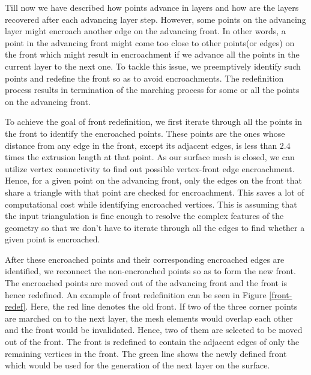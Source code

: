 \documentclass[conf]{new-aiaa}
\begin{document}
Till now we have described how points advance in layers and how are the layers recovered after each advancing layer step. However, some points on the advancing layer might encroach another edge on the advancing front. In other words, a point in the advancing front might come too close to other points(or edges) on the front which might result in encroachment if we advance all the points in the current layer to the next one. To tackle this issue, we preemptively identify such points and redefine the front so as to avoid encroachments. The redefinition process results in termination of the marching process for some or all the points on the advancing front.

To achieve the goal of front redefinition, we first iterate through all the points in the front to identify the encroached points. These points are the ones whose distance from any edge in the front, except its adjacent edges, is less than $2.4$ times the extrusion length at that point. As our surface mesh is closed, we can utilize vertex connectivity to find out possible vertex-front edge encroachment. Hence, for a given point on the advancing front, only the edges on the front that share a triangle with that point are checked for encroachment. This saves a lot of computational cost while identifying encroached vertices. This is assuming that the input triangulation is fine enough to resolve the complex features of the geometry so that we don't have to iterate through all the edges to find whether a given point is encroached. 

After these encroached points and their corresponding encroached edges are identified, we reconnect the non-encroached points so as to form the new front. The encroached points are moved out of the advancing front and the front is hence redefined. An example of front redefinition can be seen in Figure \ref{front-redef}. Here, the red line denotes the old front. If two of the three corner points are marched on to the next layer, the mesh elements would overlap each other and the front would be invalidated. Hence, two of them are selected to be moved out of the front. The front is redefined to contain the adjacent edges of only the remaining vertices in the front. The green line shows the newly defined front which would be used for the generation of the next layer on the surface.
\end{document}
